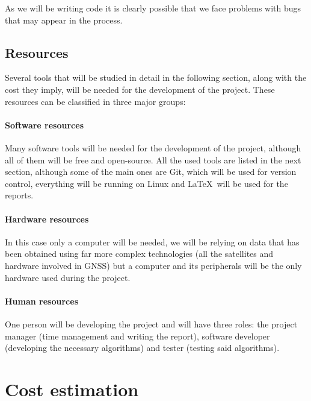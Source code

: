 As we will be writing code it is clearly possible that we face problems with bugs that may appear in the process.

\subsection{Resources}

Several tools that will be studied in detail in the following section, along with the cost they imply, will be needed for the development of the project. These resources can be classified in three major groups:

\paragraph{Software resources}

Many software tools will be needed for the development of the project, although all of them will be free and open-source. All the used tools are listed in the next section, although some of the main ones are Git, which will be used for version control, everything will be running on Linux and \LaTeX\ will be used for the reports. 

\paragraph{Hardware resources}

In this case only a computer will be needed, we will be relying on data that has been obtained using far more complex technologies (all the satellites and hardware involved in GNSS) but a computer and its peripherals will be the only hardware used during the project.

\paragraph{Human resources}

One person will be developing the project and will have three roles: the project manager (time management and writing the report), software developer (developing the necessary algorithms) and tester (testing said algorithms).


\section{Cost estimation}

